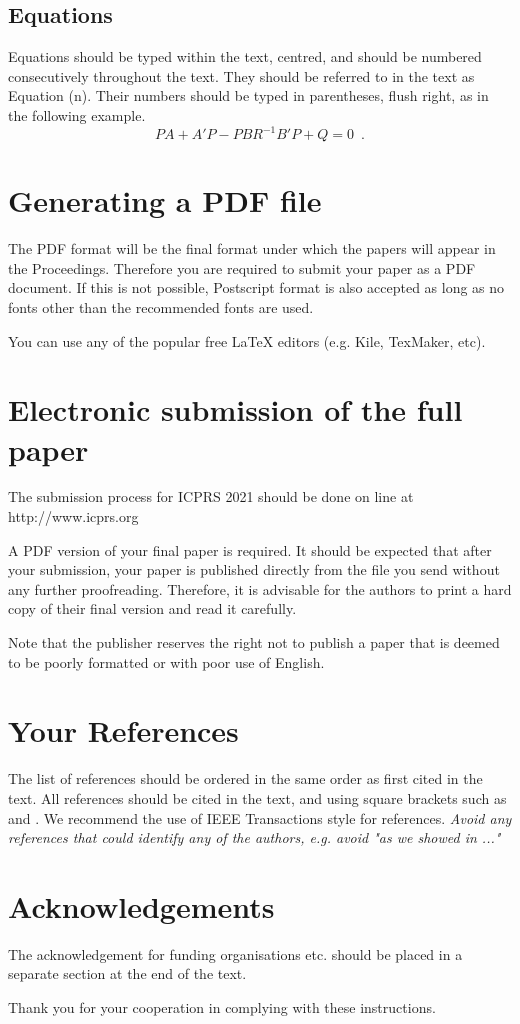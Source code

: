 \documentclass[10pt]{article}
\begin{document}
\subsection{Equations}
Equations should be typed within the text, centred, and should
be numbered consecutively throughout the text. They should
be referred to in the text as Equation (n). Their numbers
should be typed in parentheses, flush right, as in the following
example.
\begin{equation}
	    PA + A'P - PBR^{-1}B'P + Q  =  0 \enspace.
\end{equation}

\section{Generating a {PDF} file}
The PDF format will be the final format under which the
papers will appear in the Proceedings. Therefore you are
required to submit your paper as a PDF document. If this is not
possible, Postscript format is also accepted as long as no fonts
other than the recommended fonts are used.

You can use any of the popular free LaTeX editors (e.g. Kile, TexMaker, etc).

\section{Electronic submission of the full paper}
The submission process for ICPRS 2021 should be done on
line at http://www.icprs.org

A PDF version of your final paper is required. It should
be expected that after your submission, your paper is
published directly from the file you send without any further
proofreading. Therefore, it is advisable for the authors to
print a hard copy of their final version and read it carefully.

Note that the publisher reserves the right not to publish a paper that is deemed to be poorly formatted or with poor use of English.

\section{Your References}
The list of references should be ordered in the same order as
first cited in the text. All references should be cited in the
text, and using square brackets such as \cite{ref01} and \cite{ref01,ref02}. We
recommend the use of IEEE Transactions style for references. \textit{Avoid any references
that could identify any of the authors, e.g. avoid "as we showed in ..."}

\section*{Acknowledgements}
The acknowledgement for funding organisations etc. should
be placed in a separate section at the end of the text.



Thank you for your cooperation in complying with these
instructions.



\end{document}
